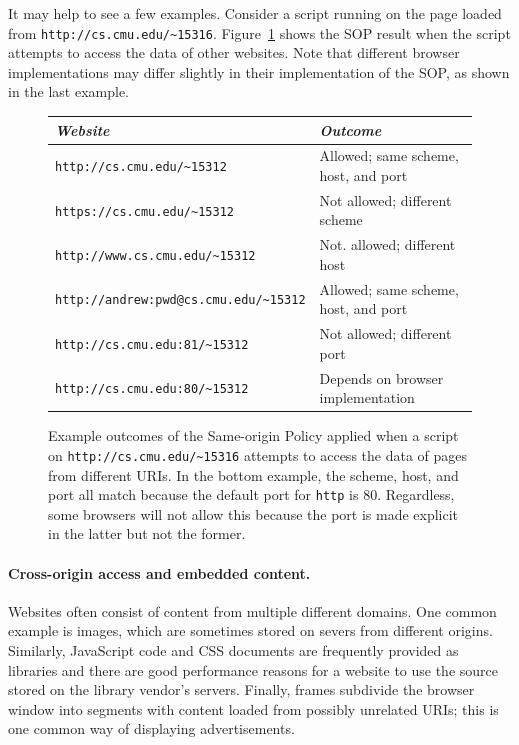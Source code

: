 \documentclass[11pt,twoside]{scrartcl}
\begin{document}
It may help to see a few examples. Consider a script running on the page loaded from \verb'http://cs.cmu.edu/~15316'. Figure~\ref{fig:sop} shows the SOP result when the script attempts to access the data of other websites. Note that different browser implementations may differ slightly in their implementation of the SOP, as shown in the last example.

\begin{figure}
\centering
\begin{tabular}{l|l}
\hline
\emph{Website} & \emph{Outcome}
\\
\hline
\verb'http://cs.cmu.edu/~15312' & Allowed; same scheme, host, and port \\
\verb'https://cs.cmu.edu/~15312' & Not allowed; different scheme \\
\verb'http://www.cs.cmu.edu/~15312' & Not. allowed; different host \\
\verb'http://andrew:pwd@cs.cmu.edu/~15312' & Allowed; same scheme, host, and port \\
\verb'http://cs.cmu.edu:81/~15312' & Not allowed; different port \\
\verb'http://cs.cmu.edu:80/~15312' & Depends on browser implementation \\
\end{tabular}

\caption{\label{fig:sop} Example outcomes of the Same-origin Policy applied when a script on \nolinkurl{http://cs.cmu.edu/~15316} attempts to access the data of pages from different URIs. In the bottom example, the scheme, host, and port all match because the default port for \texttt{http} is 80. Regardless, some browsers will not allow this because the port is made explicit in the latter but not the former.}
\end{figure}

\paragraph{Cross-origin access and embedded content.}
Websites often consist of content from multiple different domains. One common example is images, which are sometimes stored on severs from different origins. Similarly, JavaScript code and CSS documents are frequently provided as libraries and there are good performance reasons for a website to use the source stored on the library vendor's servers. Finally, frames subdivide the browser window into segments with content loaded from possibly unrelated URIs; this is one common way of displaying advertisements.
\end{document}
